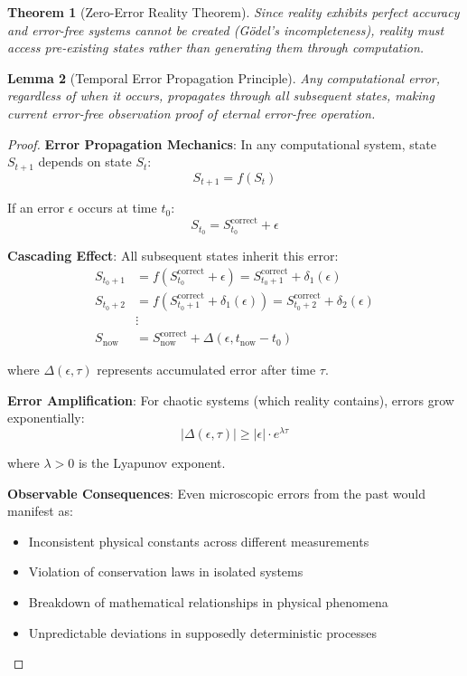 \documentclass[12pt,a4paper]{article}
\newtheorem{theorem}{Theorem}[section]
\newtheorem{lemma}[theorem]{Lemma}
\begin{document}
\begin{theorem}[Zero-Error Reality Theorem]
Since reality exhibits perfect accuracy and error-free systems cannot be created (Gödel's incompleteness), reality must access pre-existing states rather than generating them through computation.
\end{theorem}

\begin{lemma}[Temporal Error Propagation Principle]
Any computational error, regardless of when it occurs, propagates through all subsequent states, making current error-free observation proof of eternal error-free operation.
\end{lemma}

\begin{proof}
\textbf{Error Propagation Mechanics}: In any computational system, state $S_{t+1}$ depends on state $S_t$:
$$S_{t+1} = f(S_t)$$

If an error $\epsilon$ occurs at time $t_0$:
$$S_{t_0} = S_{t_0}^{\text{correct}} + \epsilon$$

\textbf{Cascading Effect}: All subsequent states inherit this error:
\begin{align}
S_{t_0+1} &= f(S_{t_0}^{\text{correct}} + \epsilon) = S_{t_0+1}^{\text{correct}} + \delta_1(\epsilon) \\
S_{t_0+2} &= f(S_{t_0+1}^{\text{correct}} + \delta_1(\epsilon)) = S_{t_0+2}^{\text{correct}} + \delta_2(\epsilon) \\
&\vdots \\
S_{\text{now}} &= S_{\text{now}}^{\text{correct}} + \Delta(\epsilon, t_{\text{now}} - t_0)
\end{align}

where $\Delta(\epsilon, \tau)$ represents accumulated error after time $\tau$.

\textbf{Error Amplification}: For chaotic systems (which reality contains), errors grow exponentially:
$$|\Delta(\epsilon, \tau)| \geq |\epsilon| \cdot e^{\lambda \tau}$$

where $\lambda > 0$ is the Lyapunov exponent.

\textbf{Observable Consequences}: Even microscopic errors from the past would manifest as:
\begin{itemize}
    \item Inconsistent physical constants across different measurements
    \item Violation of conservation laws in isolated systems
    \item Breakdown of mathematical relationships in physical phenomena
    \item Unpredictable deviations in supposedly deterministic processes
\end{itemize}


\end{proof}
\end{document}
